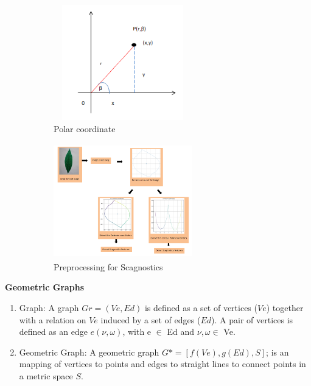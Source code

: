 \documentclass{article}
\begin{document}
\begin{figure}[!ht]
\begin{subfigure}{.5\textwidth}
\centering
        \includegraphics[width=60mm, height=50mm]{./Figures/pc.png}
        \caption{\label{pc}Polar coordinate}
        
\end{subfigure} 
\begin{subfigure}{.5\textwidth}
\centering
        \includegraphics[width=60mm, height=50mm]{./Figures/scp.png}
        \caption{\label{scp}Preprocessing for Scagnostics}
        
\end{subfigure} 

\caption{}
        \end{figure}

\textbf{Geometric Graphs}

\begin{enumerate}
\def\labelenumi{\roman{enumi})}
\item
  Graph: A graph \(Gr = (Ve, Ed)\) is defined as a set of vertices
  (\(Ve\)) together with a relation on \(Ve\) induced by a set of edges
  (\(Ed\)). A pair of vertices is defined as an edge \(e(\nu,\omega)\),
  with e \(\in\) Ed and \(\nu,\omega \in\) Ve.
\item
  Geometric Graph: A geometric graph \(G* = [f(Ve), g(Ed), S]\); is an
  mapping of vertices to points and edges to straight lines to connect
  points in a metric space \(S\).
\end{enumerate}
\end{document}

